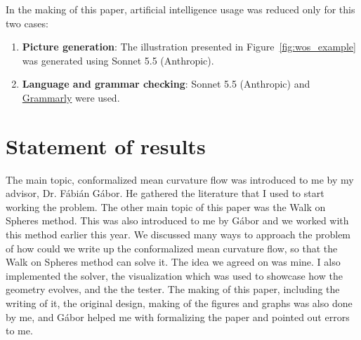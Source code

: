 \documentclass[
]{elteiktdk}[2024/04/26]
\begin{document}
	In the making of this paper, artificial intelligence usage was reduced only for this two cases:
	\begin{enumerate}
		\item \textbf{Picture generation}: The illustration presented in Figure~\ref{fig:wos_example} was generated using Sonnet 5.5 (Anthropic).
		\item \textbf{Language and grammar checking}: Sonnet 5.5 (Anthropic) and \href{https://app.grammarly.com/}{Grammarly} were used.
	\end{enumerate}
	
	\cleardoublepage
	\chapter*{Statement of results}
	
	The main topic, conformalized mean curvature flow was introduced to me by my advisor, Dr. Fábián Gábor. He gathered the literature that I used to start working the problem. The other main topic of this paper was the Walk on Spheres method. This was also introduced to me by Gábor and we worked with this method earlier this year. We discussed many ways to approach the problem of how could we write up the conformalized mean curvature flow, so that the Walk on Spheres method can solve it. The idea we agreed on was mine. I also implemented the solver, the visualization which was used to showcase how the geometry evolves, and the the tester. The making of this paper, including the writing of it, the original design, making of the figures and graphs was also done by me, and Gábor helped me with formalizing the paper and pointed out errors to me. 
	
	
	
	
\end{document}
